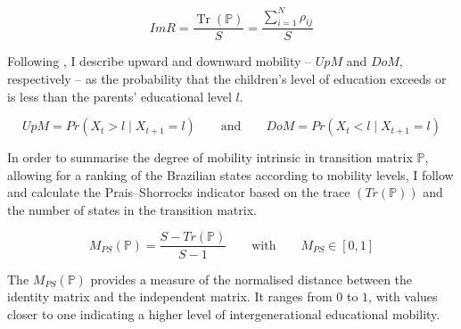 \documentclass[a4paper, 12pt]{article}
\DeclareMathOperator{\Tr}{Tr}
\begin{document}
\begin{equation} \label{eq:ImobilityRatio}
ImR=\frac{\Tr(\mathbb{P})}{S}=\frac{\sum_{i=1}^{N} \rho_{ij}}{S}
\end{equation}


Following \citet{corak2014comparison}, I describe upward and downward mobility – $UpM$ and $DoM$, respectively – as the probability that the children’s level of education exceeds or is less than the parents’ educational level $l$.


\begin{equation} \label{eq:UpwardMobility}
UpM = Pr \left(X_t > l \mid X_{t+1} = l \right) \qquad \textrm{and} \qquad DoM = Pr \left(X_t < l \mid X_{t+1} = l \right)
\end{equation}



In order to summarise the degree of mobility intrinsic in transition matrix $\mathbb{P}$, allowing for a ranking of the Brazilian states according to mobility levels, I follow \citet{checchi1999more, Daouli&Demoussis&Giannakopoulos2010} and calculate the Prais–Shorrocks indicator based on the trace $(Tr(\mathbb{P}))$ and the number of states in the transition matrix.


\begin{equation} \label{eq:PraisShorrocks}
M_{PS}(\mathbb{P})=\frac{S - Tr(\mathbb{P})}{S -1} \qquad \textrm{with} \qquad M_{PS}\in [0,1]
\end{equation}

The $M_{PS}(\mathbb{P})$ provides a measure of the normalised distance between the identity matrix and the independent matrix. It ranges from $0$ to $1$, with values closer to one indicating a higher level of intergenerational educational mobility.





\end{document}
